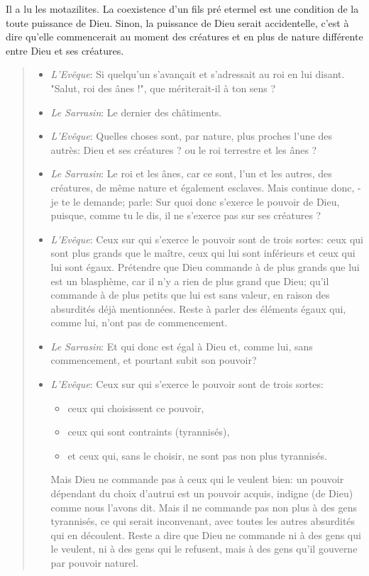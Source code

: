 Il a lu les motazilites. La coexistence d'un fils pré etermel est une condition de la toute puissance de Dieu. Sinon, la puissance de Dieu serait accidentelle, c'est à dire qu'elle commencerait au moment des créatures et en plus de nature différente entre Dieu et ses créatures. 


\begin{quote}
  \begin{itemize}

\item \textit{L'Evêque}: Si quelqu'un s'avançait et s'adressait au roi en lui disant.
"Salut, roi des ânes !", que mériterait-il à ton sens ?
\item \textit{Le Sarrasin}: Le dernier des châtiments.
\item \textit{L'Evêque}: Quelles choses sont, par nature, plus proches l'une des autrès: Dieu et ses créatures ? ou le roi terrestre et les ânes ?
\item \textit{Le Sarrasin}: Le roi et les ânes, car ce sont, l'un et les autres, des créatures, de même nature et également esclaves. Mais continue donc,
- je te le demande; parle: Sur quoi donc s'exerce le pouvoir de Dieu, puisque, comme tu le dis, il ne s'exerce pas sur ses créatures ?
\item  \textit{L'Evêque}: Ceux sur qui s'exerce le pouvoir sont de trois sortes: ceux qui sont plus grands que le maître, ceux qui lui sont inférieurs et ceux qui lui sont égaux. Prétendre que Dieu commande à de plus grands que lui est un blasphème, car il n'y a rien de plus grand que Dieu; qu'il commande à de plus petits que lui est sans valeur, en raison des absurdités déjà mentionnées. Reste à parler des éléments égaux qui, comme lui, n'ont pas de commencement.
\item \textit{Le Sarrasin}: Et qui donc est égal à Dieu et, comme lui, sans commencement, et pourtant subit son pouvoir?
\item \textit{L'Evêque}: Ceux sur qui s'exerce le pouvoir sont de trois sortes:
\begin{itemize}
    \item ceux qui choisissent ce pouvoir,
    \item  ceux qui sont contraints (tyrannisés),
    \item  et ceux qui, sans le choisir, ne sont pas non plus tyrannisés.
\end{itemize}

Mais Dieu ne commande pas à ceux qui le veulent bien: un pouvoir dépendant du choix d'autrui est un pouvoir acquis, indigne (de
Dieu) comme nous l'avons dit.
Mais il ne commande pas non plus à des gens tyrannisés, ce qui serait inconvenant, avec toutes les autres absurdités qui en découlent.
Reste a dire que Dieu ne commande ni à des gens qui le veulent, ni à des gens qui le refusent, mais à des gens qu'il gouverne par pouvoir naturel.


\end{itemize}
\end{quote}
